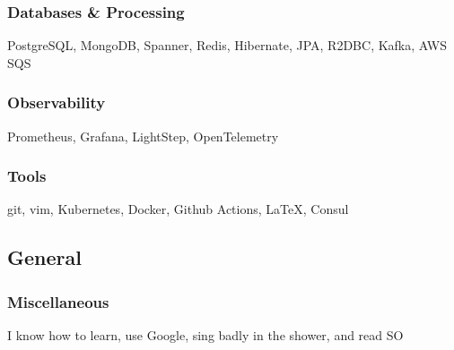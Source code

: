 \documentclass[]{two-column-resume}
\begin{document}
\begin{minipage}[t]{0.34\textwidth}
    \subsubsection{Databases \& Processing}
            PostgreSQL, 
            MongoDB, 
            Spanner, 
            Redis, 
            Hibernate, 
            JPA, 
            R2DBC, 
            Kafka, 
            AWS SQS
        \newline
    \subsubsection{Observability}
            Prometheus, 
            Grafana, 
            LightStep, 
            OpenTelemetry
        \newline
    \subsubsection{Tools}
            git, 
            vim, 
            Kubernetes, 
            Docker, 
            Github Actions, 
            \LaTeX, 
            Consul
        \newline

\sectionsep

\subsection{General}








\subsubsection{Miscellaneous}
I know how to learn, use Google, sing badly in the shower, and read SO

\setlength{\parindent}{0ex}
    \sectionsep

%
%

%
%


\end{minipage}
\end{document}
